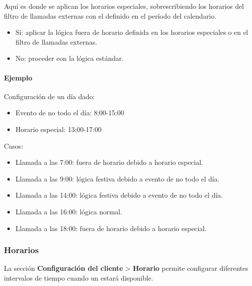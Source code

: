 \documentclass[letterpaper,10pt,spanish]{sphinxmanual}
\begin{document}
Aquí es donde se aplican los horarios especiales, sobrescribiendo los horarios del filtro de llamadas externas con el definido en el período del calendario.
\begin{itemize}
\item {} 
Sí: aplicar la lógica fuera de horario definida en los horarios especiales o en el filtro de llamadas externas.

\item {} 
No: proceder con la lógica estándar.

\end{itemize}
\paragraph{Ejemplo}

Configuración de un día dado:
\begin{itemize}
\item {} 
Evento de no todo el día: 8:00-15:00

\item {} 
Horario especial: 13:00-17:00

\end{itemize}

Casos:
\begin{itemize}
\item {} 
Llamada a las 7:00: fuera de horario debido a horario especial.

\item {} 
Llamada a las 9:00: lógica festiva debido a evento de no todo el día.

\item {} 
Llamada a las 14:00: lógica festiva debido a evento de no todo el día.

\item {} 
Llamada a las 16:00: lógica normal.

\item {} 
Llamada a las 18:00: fuera de horario debido a horario especial.

\end{itemize}


\subsubsection{Horarios}
\label{administration_portal/client/vpbx/routing_tools/schedules:id1}\label{administration_portal/client/vpbx/routing_tools/schedules::doc}\label{administration_portal/client/vpbx/routing_tools/schedules:schedules}
La sección \textbf{Configuración del cliente} \textgreater{} \textbf{Horario} permite configurar diferentes intervalos de tiempo cuando un {\hyperref[administration_portal/brand/views/ddis:ddis]{}} estará disponible.
\end{document}
